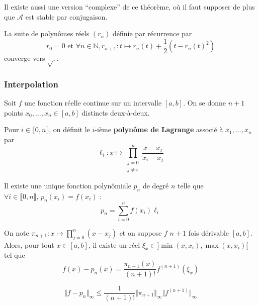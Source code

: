 	\begin{remark}
		Il existe aussi une version ``complexe'' de ce théorème, où il faut supposer de plus que $\mathcal{A}$ est stable par conjugaison.
	\end{remark}

	\begin{example}
		La suite de polynômes réels $(r_n)$ définie par récurrence par
		\[ r_0 = 0 \text{ et } \forall n \in \mathbb{N}, r_{n+1} : t \mapsto r_n(t) + \frac{1}{2} (t - r_n(t)^2) \]
		converge vers $\sqrt{.}$.
	\end{example}

	\subsubsection{Interpolation}


	Soit $f$ une fonction réelle continue sur un intervalle $[a,b]$. On se donne $n+1$ points $x_0, \dots, x_n \in [a,b]$ distincts deux-à-deux.

	\begin{definition}
		Pour $i \in \llbracket 0, n \rrbracket$, on définit le $i$-ième \textbf{polynôme de Lagrange} associé à $x_1, \dots, x_n$ par
		\[ \ell_i : x \mapsto \prod_{\substack{j=0\\j \neq i}}^n \frac{x-x_j}{x_i-x_j} \]
	\end{definition}

	\begin{theorem}
		Il existe une unique fonction polynômiale $p_n$ de degré $n$ telle que $\forall i \in \llbracket 0, n \rrbracket, \, p_n(x_i) = f(x_i)$ :
		\[ p_n = \sum_{i=0}^n f(x_i) \ell_i \]
	\end{theorem}

	\begin{theorem}
		On note $\pi_{n+1} : x \mapsto \prod_{j=0}^{n} (x-x_j)$ et on suppose $f$ $n+1$ fois dérivable $[a,b]$. Alors, pour tout $x \in [a,b]$, il existe un réel $\xi_x \in ]\min(x,x_i),\max(x,x_i)[$ tel que
		\[ f(x)-p_n(x) = \frac{\pi_{n+1}(x)}{(n+1)!} f^{(n+1)}(\xi_x) \]
	\end{theorem}

	\begin{corollary}
		\[ \Vert f - p_n \Vert_\infty \leq \frac{1}{(n+1)!} \Vert \pi_{n+1} \Vert_\infty \Vert f^{(n+1)} \Vert_\infty \]
	\end{corollary}


